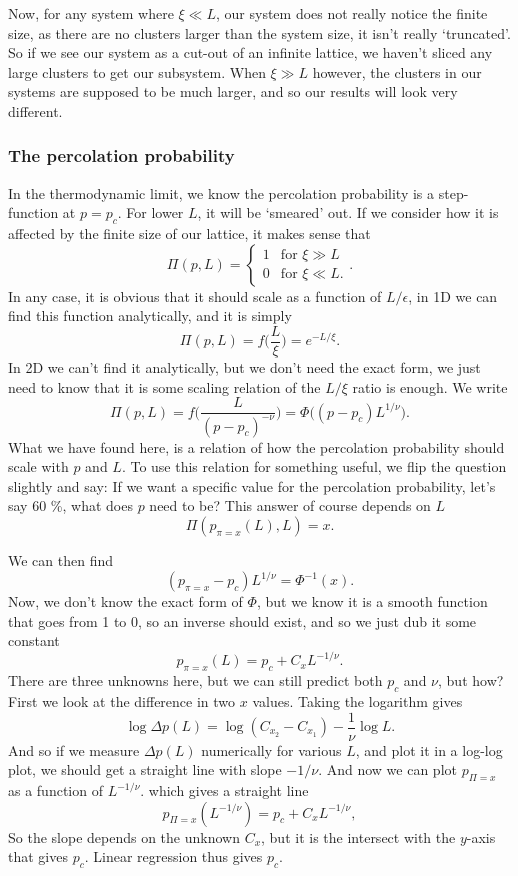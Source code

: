 \documentclass[a4paper, 11pt, notitlepage, english]{article}
\newcommand{\eps}{\epsilon}
\begin{document}
Now, for any system where $\xi \ll L$, our system does not really notice the finite size, as there are no clusters larger than the system size, it isn't really `truncated'. So if we see our system as a cut-out of an infinite lattice, we haven't sliced any large clusters to get our subsystem. When $\xi \gg L$ however, the clusters in our systems are supposed to be much larger, and so our results will look very different. 

\subsubsection*{The percolation probability}
In the thermodynamic limit, we know the percolation probability is a step-function at $p=p_c$. For lower $L$, it will be `smeared' out. If we consider how it is affected by the finite size of our lattice, it makes sense that
$$\Pi(p, L) = \begin{cases}
	1 & \mbox{for } \xi \gg L \\
	0 & \mbox{for } \xi \ll L.
\end{cases}.$$
In any case, it is obvious that it should scale as a function of $L/\eps$, in 1D we can find this function analytically, and it is simply
$$\Pi(p, L) = f\bigg(\frac{L}{\xi}\bigg) = e^{-L/\xi}.$$
In 2D we can't find it analytically, but we don't need the exact form, we just need to know that it is some scaling relation of the $L/\xi$ ratio is enough. We write
$$\Pi(p, L) = f\bigg(\frac{L}{(p-p_c)^{-\nu}}\bigg) = \Phi\big((p-p_c)L^{1/\nu}\big).$$
What we have found here, is a relation of how the percolation probability should scale with $p$ and $L$. To use this relation for something useful, we flip the question slightly and say: If we want a specific value for the percolation probability, let's say 60 \%, what does $p$ need to be? This answer of course depends on $L$
$$\Pi(p_{\pi=x}(L), L) = x.$$ 

We can then find
$$(p_{\pi=x} - p_c)L^{1/\nu} = \Phi^{-1}(x).$$
Now, we don't know the exact form of $\Phi$, but we know it is a smooth function that goes from 1 to 0, so an inverse should exist, and so we just dub it some constant
$$p_{\pi=x}(L) = p_c + C_x L^{-1/\nu}.$$
There are three unknowns here, but we can still predict both $p_c$ and $\nu$, but how? First we look at the difference in two $x$ values. Taking the logarithm gives
$$\log \Delta p(L) = \log (C_{x_2} - C_{x_1}) - \frac{1}{\nu} \log L.$$
And so if we measure $\Delta p(L)$ numerically for various $L$, and plot it in a log-log plot, we should get a straight line with slope $-1/\nu$. And now we can plot $p_{\Pi=x}$ as a function of $L^{-1/\nu}$. which gives a straight line
$$p_{\Pi = x}(L^{-1/\nu}) = p_c + C_x L ^{-1/\nu},$$
So the slope depends on the unknown $C_x$, but it is the intersect with the $y$-axis that gives $p_c$. Linear regression thus gives $p_c$.
\end{document}
